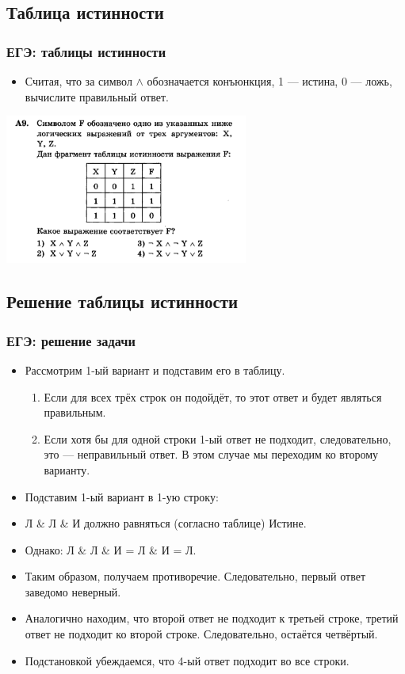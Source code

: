 \documentclass[compress,red]{beamer}
\begin{document}
\subsection{Таблица истинности}
\begin{frame}[fragile]
  \frametitle{ЕГЭ: таблицы истинности}
  \begin{itemize}
      \item \small{Считая, что за символ $\wedge$ обозначается конъюнкция, 1 --- истина, 0 --- ложь, вычислите правильный ответ.}
  \end{itemize}
  \centerline{\includegraphics[width=0.6\textwidth]{images/logic-04.png}}
\end{frame}

\subsection{Решение таблицы истинности}
\begin{frame}[fragile]
  \frametitle{ЕГЭ: решение задачи}
  \begin{itemize}
    \item Рассмотрим 1-ый вариант и подставим его в таблицу. 
        \begin{enumerate}
            \item Если для всех трёх строк он подойдёт, то этот ответ и будет являться правильным. 
            \item Если хотя бы для одной строки 1-ый ответ не подходит, следовательно, это --- неправильный ответ. В этом случае мы переходим ко второму варианту.
        \end{enumerate}
    \item Подставим 1-ый вариант в 1-ую строку:
    \item Л \& Л \& И должно равняться (согласно таблице) Истине. 
    \item Однако: Л \& Л \& И = Л \& И = Л.
    \item Таким образом, получаем противоречие. Следовательно, первый ответ заведомо неверный.
    \item Аналогично находим, что второй ответ не подходит к третьей строке, третий ответ не подходит ко второй строке. Следовательно, остаётся четвёртый.
    \item Подстановкой убеждаемся, что 4-ый ответ подходит во все строки.
  \end{itemize}
\end{frame}
\end{document}
